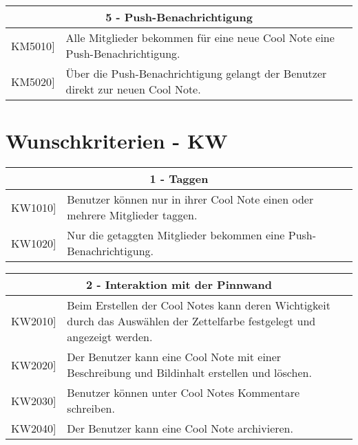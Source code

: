 \documentclass[a4paper]{scrreprt}
\begin{document}
    	\vspace{5mm}
    	
    	\begin{table}[h!]
    		\centering
    		\label{my-label}
    		\begin{tabular}{p{2cm}p{12cm}}
    			
    			\multicolumn{2}{c}{\textbf{5 - Push-Benachrichtigung}} \\ \hline
    			\centering{[}KM5010{]} & Alle Mitglieder bekommen für eine neue Cool Note eine Push-Benachrichtigung.\\
    			\centering{[}KM5020{]}& Über die Push-Benachrichtigung gelangt der Benutzer direkt zur neuen Cool Note.                               \\
    			
    			\hline
    		\end{tabular}
    	\end{table}
    	
    	\vspace{1cm}    	

        \section{Wunschkriterien - KW}
		\begin{table}[h!]
			\centering
			\label{my-label}
			\begin{tabular}{p{2cm}p{12cm}}
				
				\multicolumn{2}{c}{\textbf{1 - Taggen}} \\ \hline
				\centering{[}KW1010{]} & Benutzer können nur in ihrer Cool Note einen oder mehrere Mitglieder taggen.\\
				\centering{[}KW1020{]}& Nur die getaggten Mitglieder bekommen eine Push-Benachrichtigung.                               \\
				\hline
			\end{tabular}
		\end{table}
		
		\vspace{5mm}
		
		\begin{table}[h!]
			\centering
			\label{my-label}
			\begin{tabular}{p{2cm}p{12cm}}
				
				\multicolumn{2}{c}{\textbf{2 - Interaktion mit der Pinnwand}} \\ \hline
				\centering{[}KW2010{]} & Beim Erstellen der Cool Notes kann deren Wichtigkeit durch das Auswählen der Zettelfarbe festgelegt und angezeigt werden.\\
				\centering{[}KW2020{]}& Der Benutzer kann eine Cool Note mit einer Beschreibung und Bildinhalt erstellen und löschen.                              \\
				\centering{[}KW2030{]}& Benutzer können unter Cool Notes Kommentare schreiben.\\ 
				\centering{[}KW2040{]}& Der Benutzer kann eine Cool Note archivieren.\\ 
				\hline
			\end{tabular}
		\end{table}
		
\end{document}
